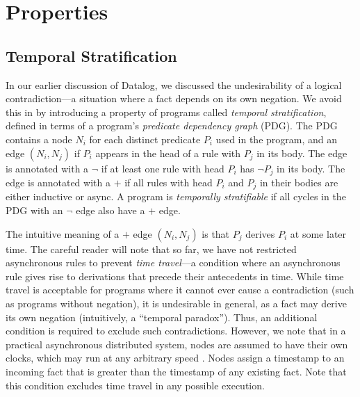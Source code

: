 \section{Properties}

\subsection{Temporal Stratification}

In our earlier discussion of Datalog, we discussed the undesirability of a
logical contradiction---a situation where a fact depends on its own negation.
We avoid this in \lang by introducing a property of programs called {\em
  temporal stratification}, defined in terms of a program's {\em predicate
  dependency graph} (PDG).  The PDG contains a node $N_i$ for each distinct
predicate $P_i$ used in the program, and an edge $(N_i, N_j)$ if $P_i$ appears
in the head of a rule with $P_j$ in its body.  The edge is annotated with a
$\lnot$ if at least one rule with head $P_i$ has $\lnot P_j$ in its body.  The
edge is annotated with a $+$ if all rules with head $P_i$ and $P_j$ in their
bodies are either inductive or async.  A \lang program is {\em temporally
  stratifiable} if all cycles in the PDG with an $\lnot$ edge also have a $+$
edge.

The intuitive meaning of a $+$ edge $(N_i, N_j)$ is that $P_j$ derives $P_i$ at
some later time.  The careful reader will note that so far, we have not
restricted asynchronous rules to prevent {\em time travel}---a condition where
an asynchronous rule gives rise to derivations that precede their antecedents
in time.  While time travel is acceptable for programs where it cannot ever
cause a contradiction (such as programs without negation), it is undesirable in
general, as a fact may derive its own negation (intuitively, a ``temporal
paradox'').  Thus, an additional condition is required to exclude such
contradictions.
 
However, we note that in a practical asynchronous distributed system, nodes are
assumed to have their own clocks, which may run at any arbitrary speed
.  Nodes assign a
timestamp to an incoming fact that is greater than the timestamp of any
existing fact.  Note that this condition excludes time travel in any possible
execution.

